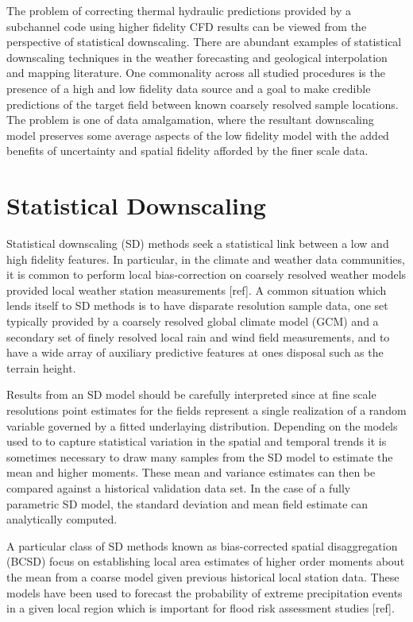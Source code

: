 
The problem of correcting thermal hydraulic predictions provided by a subchannel code using higher fidelity CFD results can be viewed from the perspective of statistical downscaling.  There are abundant examples of statistical downscaling techniques in the weather forecasting and geological interpolation and mapping literature.  One commonality across all studied procedures is the presence of a high and low fidelity data source and a goal to make credible predictions of the target field between known coarsely resolved sample locations.  The problem is one of data amalgamation, where the resultant downscaling model preserves some average aspects of the low fidelity model with the added benefits of uncertainty and spatial fidelity afforded by the finer scale data.

\section{Statistical Downscaling}

Statistical downscaling (SD) methods seek a statistical link between a low and high fidelity features. 
In particular, in the climate and weather data communities, it is common to perform local bias-correction on coarsely resolved weather models provided local weather station measurements [ref].    A common situation which lends itself to SD methods is to have disparate resolution sample data, one set typically provided by a coarsely resolved global climate model (GCM) and a secondary set of finely resolved local rain and wind field measurements, and to have a wide array of auxiliary predictive features at ones disposal such as the terrain height.

Results from an SD model should be carefully interpreted since at fine scale resolutions point estimates for the fields represent a single realization of a random variable governed by a fitted underlaying distribution.  Depending on the models used to to capture statistical variation in the spatial and temporal trends it is sometimes necessary to draw many samples from the SD model to estimate the mean and higher moments.  These mean and variance estimates can then be compared against a historical validation data set.  In the case of a fully parametric SD model, the standard deviation and mean field estimate can analytically computed.

A particular class of SD methods known as bias-corrected spatial disaggregation (BCSD) focus on establishing local area estimates of higher order moments about the mean from a coarse model given previous historical local station data.  These models have been used to forecast the probability of extreme precipitation events in a given local region which is important for flood risk assessment studies [ref].

